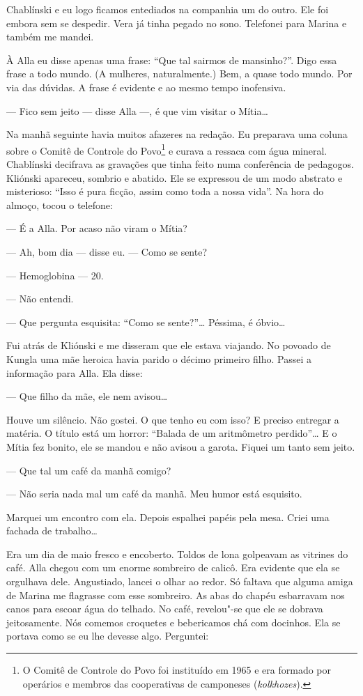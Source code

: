 Chablínski e eu logo ficamos entediados na companhia um do outro. Ele
foi embora sem se despedir. Vera já tinha pegado no sono. Telefonei para
Marina e também me mandei.

À Alla eu disse apenas uma frase: ``Que tal sairmos de mansinho?''. Digo
essa frase a todo mundo. (A mulheres, naturalmente.) Bem, a quase todo
mundo. Por via das dúvidas. A frase é evidente e ao mesmo tempo
inofensiva.

--- Fico sem jeito --- disse Alla ---, é que vim visitar o Mítia\ldots{}

Na manhã seguinte havia muitos afazeres na redação. Eu preparava uma
coluna sobre o Comitê de Controle do Povo\footnote{O Comitê de Controle
  do Povo foi instituído em 1965 e era formado por operários e membros
  das cooperativas de camponeses (\emph{kolkhozes}).} e curava a ressaca
com água mineral. Chablínski decifrava as gravações que tinha feito numa
conferência de pedagogos. Kliónski apareceu, sombrio e abatido. Ele se
expressou de um modo abstrato e misterioso: ``Isso é pura ficção, assim
como toda a nossa vida''. Na hora do almoço, tocou o telefone:

--- É a Alla. Por acaso não viram o Mítia?

--- Ah, bom dia --- disse eu. --- Como se sente?

--- Hemoglobina --- 20.

--- Não entendi.

--- Que pergunta esquisita: ``Como se sente?''\ldots{} Péssima, é óbvio\ldots{}

Fui atrás de Kliónski e me disseram que ele estava viajando. No povoado
de Kungla uma mãe heroica havia parido o décimo primeiro filho. Passei a
informação para Alla. Ela disse:

--- Que filho da mãe, ele nem avisou\ldots{}

Houve um silêncio. Não gostei. O que tenho eu com isso? E preciso
entregar a matéria. O título está um horror: ``Balada de um aritmômetro
perdido''\ldots{} E o Mítia fez bonito, ele se mandou e não avisou a garota.
Fiquei um tanto sem jeito.

--- Que tal um café da manhã comigo?

--- Não seria nada mal um café da manhã. Meu humor está esquisito.

Marquei um encontro com ela. Depois espalhei papéis pela mesa. Criei uma
fachada de trabalho\ldots{}

Era um dia de maio fresco e encoberto. Toldos de lona golpeavam as
vitrines do café. Alla chegou com um enorme sombreiro de calicô. Era
evidente que ela se orgulhava dele. Angustiado, lancei o olhar ao redor.
Só faltava que alguma amiga de Marina me flagrasse com esse sombreiro.
As abas do chapéu esbarravam nos canos para escoar água do telhado. No
café, revelou"-se que ele se dobrava jeitosamente. Nós comemos croquetes
e bebericamos chá com docinhos. Ela se portava como se eu lhe devesse
algo. Perguntei:

